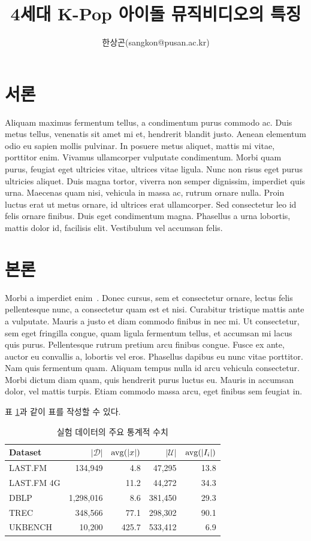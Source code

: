 \documentclass{pnu-survey}
\title{4세대 K-Pop 아이돌 뮤직비디오의 특징}
\author{한상곤(sangkon@pusan.ac.kr)}
\begin{document}
\maketitle

\section{서론}

Aliquam maximus fermentum tellus, a condimentum purus commodo ac. Duis metus tellus, venenatis sit amet mi et, hendrerit blandit justo. Aenean elementum odio eu sapien mollis pulvinar. In posuere metus aliquet, mattis mi vitae, porttitor enim. Vivamus ullamcorper vulputate condimentum. Morbi quam purus, feugiat eget ultricies vitae, ultrices vitae ligula. Nunc non risus eget purus ultricies aliquet. Duis magna tortor, viverra non semper dignissim, imperdiet quis urna. Maecenas quam nisi, vehicula in massa ac, rutrum ornare nulla. Proin luctus erat ut metus ornare, id ultrices erat ullamcorper. Sed consectetur leo id felis ornare finibus. Duis eget condimentum magna. Phasellus a urna lobortis, mattis dolor id, facilisis elit. Vestibulum vel accumsan felis.

\section{본론}

Morbi a imperdiet enim~\cite{syh}. Donec cursus, sem et consectetur ornare, lectus felis pellentesque nunc, a consectetur quam est et nisi. Curabitur tristique mattis ante a vulputate. Mauris a justo et diam commodo finibus in nec mi. Ut consectetur, sem eget fringilla congue, quam ligula fermentum tellus, et accumsan mi lacus quis purus. Pellentesque rutrum pretium arcu finibus congue. Fusce ex ante, auctor eu convallis a, lobortis vel eros. Phasellus dapibus eu nunc vitae porttitor. Nam quis fermentum quam. Aliquam tempus nulla id arcu vehicula consectetur. Morbi dictum diam quam, quis hendrerit purus luctus eu. Mauris in accumsan dolor, vel mattis turpis. Etiam commodo massa arcu, eget finibus sem feugiat in.

표 \ref{tab:datasets}과 같이 표를 작성할 수 있다.
\begin{table}[!ht]
\centering
\setlength{\belowcaptionskip}{5pt}
\caption{실험 데이터의 주요 통계적 수치}
\label{tab:datasets}
\begin{tabular}{@{}lrrrr@{}} 
\toprule
{\bfseries Dataset} & $|\mathcal{D}|$ & ${\rm avg}(|x|)$ & $|\mathcal{U}|$ & ${\rm avg}(|I_i|)$ \\
\midrule
LAST.FM			&134,949	&  4.8	& 47,295	& 13.8\\
LAST.FM 4G		&			& 11.2	& 44,272	& 34.3\\
DBLP			&1,298,016	&  8.6	&381,450	& 29.3\\
TREC			&348,566	& 77.1	&298,302	& 90.1\\
UKBENCH			&10,200		&425.7	&533,412	&  6.9\\
\bottomrule
\end{tabular}
\end{table}
\end{document}

